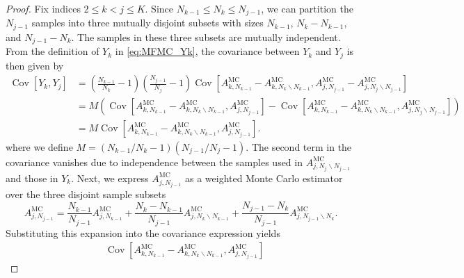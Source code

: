 \begin{proof}
Fix indices $2\le k<j\le K$. Since $N_{k-1}\le N_k\le N_{j-1}$, we can partition the $N_{j-1}$ samples into three mutually disjoint subsets with sizes $N_{k-1}$, $N_{k}-N_{k-1}$, and $N_{j-1} - N_{k}$. The samples in these three subsets are mutually independent. From the definition of $Y_k$ in \eqref{eq:MFMC_Yk},  the covariance between $Y_k$ and $Y_j$ is then given by
\begin{align*}
    \operatorname{Cov}\left[Y_k,Y_j\right] &= \left(\frac{N_{k-1}}{N_k}-1\right) \left(\frac{N_{j-1}}{N_j}-1\right)\operatorname{Cov}\left[A_{k, N_{k-1}}^{\text{MC}} - A_{k,N_{k}\backslash N_{k-1}}^{\text{MC}}, A_{j,N_{j-1}}^{\text{MC}} - A_{j,N_{j}\backslash N_{j-1}}^{\text{MC}}\right]\\
    & = M \left(\operatorname{Cov}\left[A_{k,N_{k-1}}^{\text{MC}} - A_{k,N_{k}\backslash N_{k-1}}^{\text{MC}}, A_{j,N_{j-1}}^{\text{MC}}\right] - \operatorname{Cov}\left[A_{k,N_{k-1}}^{\text{MC}} - A_{k,N_{k}\backslash N_{k-1}}^{\text{MC}}, A_{j,N_{j}\backslash N_{j-1}}^{\text{MC}}\right] \right)\\
    & = M \operatorname{Cov}\left[A_{k,N_{k-1}}^{\text{MC}} - A_{k,N_{k}\backslash N_{k-1}}^{\text{MC}}, A_{j,N_{j-1}}^{\text{MC}}\right].
\end{align*}
where we define $M = (N_{k-1}/N_k-1) (N_{j-1}/N_j-1)$. The second term in the covariance vanishes due to independence between the samples used in $A_{j,N_{j}\backslash N_{j-1}}^{\text{MC}}$ and those in $Y_k$. Next, we express $A_{j,N_{j-1}}^{\text{MC}}$ as a weighted Monte Carlo estimator over the three disjoint sample subsets
%
\begin{equation*}
    A_{j,N_{j-1}}^{\text{MC}} = \frac{N_{k-1}}{N_{j-1}}A_{j,N_{k-1}}^{\text{MC}} + \frac{N_k - N_{k-1}}{N_{j-1}} A_{j,N_{k}\backslash N_{k-1}}^{\text{MC}} + \frac{N_{j-1} - N_k}{N_{j-1}} A_{j,N_{j-1}\backslash N_{k}}^{\text{MC}}.
\end{equation*}
%
Substituting this expansion into the covariance expression yields
%
\begin{align*}
    &\operatorname{Cov}\left[A_{k,N_{k-1}}^{\text{MC}} - A_{k,N_{k}\backslash N_{k-1}}^{\text{MC}}, A_{j,N_{j-1}}^{\text{MC}}\right]

\end{align*}
\end{proof}
